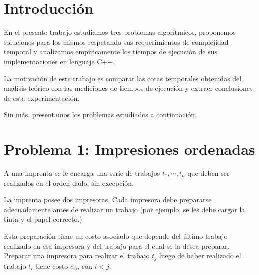 \documentclass[a4paper, 10pt, twoside]{article}
\begin{document}
\newpage




\tableofcontents

\newpage




\section{Introducción}

En el presente trabajo estudiamos tres problemas algorítmicos, proponemos soluciones para los mismos respetando sus requerimientos de complejidad temporal y analizamos empíricamente los tiempos de ejecución de sus implementaciones en lenguaje C++.

La motivación de este trabajo es comparar las cotas temporales obtenidas del análisis teórico con las mediciones de tiempos de ejecución y extraer conclusiones de esta experimentación.

Sin más, presentamos los problemas estudiados a continuación.




\newpage

\section{Problema 1: Impresiones ordenadas}

A una imprenta se le encarga una serie de trabajos $t_1, \cdots, t_n$ que deben ser realizados en el orden dado, sin excepción.

La imprenta posee dos impresoras. Cada impresora debe prepararse adecuadamente antes de realizar un trabajo (por ejemplo, se les debe cargar la tinta y el papel correcto.)

Esta preparación tiene un costo asociado que depende del último trabajo realizado en esa impresora y del trabajo para el cual se la desea preparar. Preparar una impresora para realizar el trabajo $t_j$ luego de haber realizado el trabajo $t_i$ tiene costo $c_{ij}$, con $i < j$.
\end{document}
